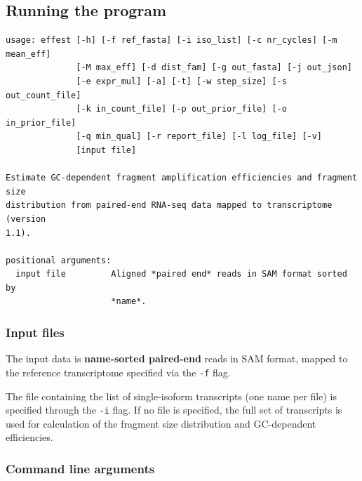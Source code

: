 
\subsection{Running the program}

\begin{verbatim}
usage: effest [-h] [-f ref_fasta] [-i iso_list] [-c nr_cycles] [-m mean_eff]
              [-M max_eff] [-d dist_fam] [-g out_fasta] [-j out_json]
              [-e expr_mul] [-a] [-t] [-w step_size] [-s out_count_file]
              [-k in_count_file] [-p out_prior_file] [-o in_prior_file]
              [-q min_qual] [-r report_file] [-l log_file] [-v]
              [input file]

Estimate GC-dependent fragment amplification efficiencies and fragment size
distribution from paired-end RNA-seq data mapped to transcriptome (version
1.1).

positional arguments:
  input file         Aligned *paired end* reads in SAM format sorted by
                     *name*.
\end{verbatim}

\subsubsection{Input files}

The input data is \textbf{name-sorted paired-end} reads in SAM format, mapped to the reference transcriptome
specified via the \texttt{-f} flag.

The file containing the list of single-isoform transcripts (one name per file) is specified through the \texttt{-i} flag. If no file is specified, the full set of transcripts is used for calculation of the fragment size distribution and GC-dependent efficiencies.


\subsubsection{Command line arguments}

